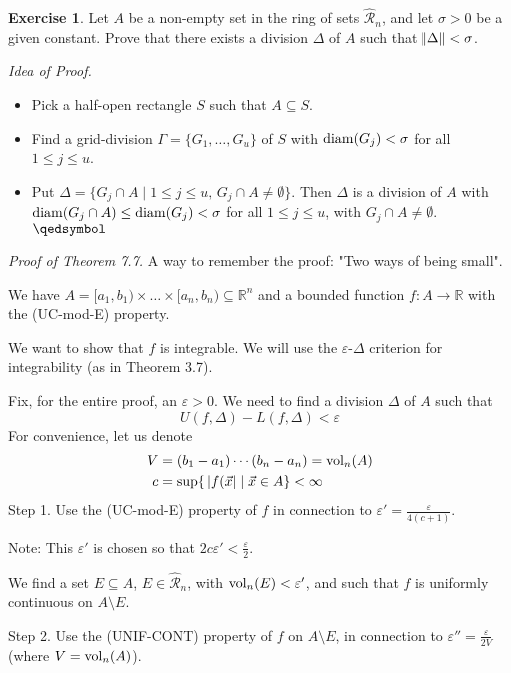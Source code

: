 \documentclass[11pt]{article}
\theoremstyle{definition}
\newtheorem{exercise}[thm]{Exercise}
\newcommand{\R}{\ensuremath{\mathbb{R}}}
\begin{document}
\begin{exercise} 
Let $A$ be a non-empty set in the ring of sets $\widehat{\mathcal{R}}_n$, and let $\sigma > 0$ be a given constant. Prove that there exists a division $\Delta$ of $A$ such that $\norm{\Delta} < \sigma$. 

\emph{Idea of Proof.}~ \vspace{-1.5ex}
\begin{itemize}
    \item Pick a half-open rectangle $S$ such that $A \subseteq S$. 
    \item Find a grid-division $\Gamma = \{G_1, \dots, G_u\}$ of $S$ with ${\rm diam}(G_j) < \sigma$ for all $1 \leq j \leq u$. 
    \item Put $\Delta = \{G_j \cap A \mid 1 \leq j \leq u,\, G_j \cap A \neq \emptyset\}$. Then $\Delta$ is a division of $A$ with ${\rm diam}(G_j \cap A) \leq {\rm diam}(G_j) < \sigma$ for all $1 \leq j \leq u$, with $G_j \cap A \neq \emptyset$. \hfill $\qedsymbol$
\end{itemize}
\end{exercise}

\emph{Proof of Theorem 7.7.} A way to remember the proof: "Two ways of being small".

We have $A = [a_1, b_1) \times \dots \times [a_n, b_n) \subseteq \R^n$ and a bounded function $f: A \to \R$ with the (UC-mod-E) property.

We want to show that $f$ is integrable. We will use the $\varepsilon$-$\Delta$ criterion for integrability (as in Theorem 3.7).

Fix, for the entire proof, an $\varepsilon > 0$. We need to find a division $\Delta$ of $A$ such that 
$$U(f, \Delta) - L(f, \Delta) < \varepsilon$$
For convenience, let us denote
\begin{align*}
    V &= (b_1 - a_1) \cdots (b_n - a_n) = {\rm vol}_n(A) \\
    c &= \sup\{\,|f(\vec{x}| \mid \vec{x} \in A \} < \infty
\end{align*}
{\sc Step 1.} Use the (UC-mod-E) property of $f$ in connection to $\varepsilon' = \frac{\varepsilon}{4(c+1)}$. 

Note: This $\varepsilon'$ is chosen so that $2c\varepsilon' < \frac{\varepsilon}2$.

We find a set $E \subseteq A$, $E \in \widehat{\mathcal{R}}_n$, with ${\rm vol}_n (E) < \varepsilon'$, and such that $f$ is uniformly continuous on $A \setminus E$.

{\sc Step 2.} Use the (UNIF-CONT) property of $f$ on $A \setminus E$, in connection to $\varepsilon'' = \frac{\varepsilon}{2V}$ (where $V = {\rm vol}_n (A)$).
\end{document}
